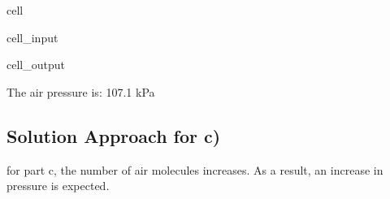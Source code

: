 \documentclass[letterpaper,10pt,english]{jupyterBook}
\begin{document}
\begin{sphinxuseclass}{cell}\begin{sphinxVerbatimInput}

\begin{sphinxuseclass}{cell_input}
\begin{sphinxVerbatim}[commandchars=\\\{\}]
     
         
  
\end{sphinxVerbatim}

\end{sphinxuseclass}\end{sphinxVerbatimInput}
\begin{sphinxVerbatimOutput}

\begin{sphinxuseclass}{cell_output}
\begin{sphinxVerbatim}[commandchars=\\\{\}]
The air pressure is: 107.1 kPa
\end{sphinxVerbatim}

\end{sphinxuseclass}\end{sphinxVerbatimOutput}

\end{sphinxuseclass}

\subsection{Solution Approach for c)}
\label{\detokenize{notebooks/Chapter3/CH3-Q1_v1:solution-approach-for-c}}
\sphinxAtStartPar
for part c, the number of air molecules increases. As a result, an increase in pressure is expected.
\end{document}
